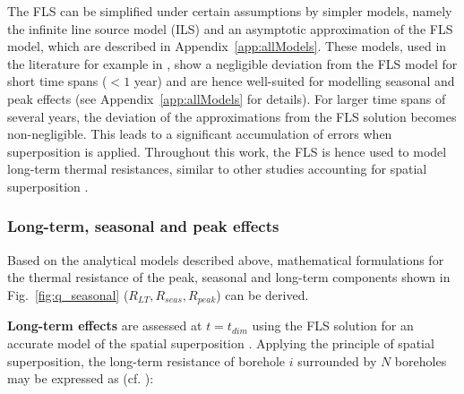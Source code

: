 The FLS can be simplified under certain assumptions by simpler models, namely the infinite line source model (ILS) and an asymptotic approximation of the FLS model, which are described in Appendix~\ref{app:allModels}.
These models, used in the literature for example in \cite{alcaraz_advection_2016,alcaraz_t-i-ger_2017,casasso_g.pot:_2016,bayer_strategic_2014}, show a negligible deviation from the FLS model for short time spans ($< 1$ year) and are hence well-suited for modelling seasonal and peak effects (see Appendix~\ref{app:allModels} for details).
%
For larger time spans of several years, the deviation of the approximations from the FLS solution becomes non-negligible.
This leads to a significant accumulation of errors when superposition is applied.
Throughout this work, the FLS is hence used to model long-term thermal resistances, similar to other studies accounting for spatial superposition \cite{miglani_methodology_2018,rivera_increased_2017}.

\subsubsection{Long-term, seasonal and peak effects}
\label{seas_peak}

Based on the analytical models described above, mathematical formulations for the thermal resistance of the peak, seasonal and long-term components shown in Fig.~\ref{fig:q_seasonal} ($R_{LT},R_{seas},R_{peak}$) can be derived. 

\textbf{Long-term effects} are assessed at $t = t_\mathit{dim}$ using the FLS solution for an accurate model of the spatial superposition \cite{miglani_methodology_2018,rivera_increased_2017}.
%
Applying the principle of spatial superposition, 
the long-term resistance of borehole $i$ surrounded by $N$ boreholes may be expressed as (cf. \cite{claesson_analytical_2011}):

